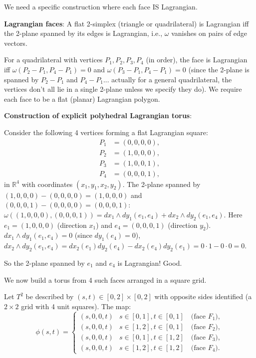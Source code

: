 \documentclass[12pt]{article}
\theoremstyle{definition}
\begin{document}
We need a specific construction where each face IS Lagrangian.

\textbf{Lagrangian faces}: A flat 2-simplex (triangle or quadrilateral) is Lagrangian iff the 2-plane spanned by its edges is Lagrangian, i.e., $\omega$ vanishes on pairs of edge vectors.

For a quadrilateral with vertices $P_1, P_2, P_3, P_4$ (in order), the face is Lagrangian iff $\omega(P_2-P_1, P_4-P_1) = 0$ and $\omega(P_3-P_1, P_4-P_1) = 0$ (since the 2-plane is spanned by $P_2-P_1$ and $P_4-P_1$... actually for a general quadrilateral, the vertices don't all lie in a single 2-plane unless we specify they do). We require each face to be a flat (planar) Lagrangian polygon.

\textbf{Construction of explicit polyhedral Lagrangian torus}:

Consider the following 4 vertices forming a flat Lagrangian square:
\begin{align*}
P_1 &= (0,0,0,0),\\
P_2 &= (1,0,0,0),\\
P_3 &= (1,0,0,1),\\
P_4 &= (0,0,0,1),
\end{align*}
in $\mathbb{R}^4$ with coordinates $(x_1,y_1,x_2,y_2)$. The 2-plane spanned by $(1,0,0,0)-(0,0,0,0) = (1,0,0,0)$ and $(0,0,0,1)-(0,0,0,0) = (0,0,0,1)$:
$\omega((1,0,0,0),(0,0,0,1)) = dx_1\wedge dy_1(e_1, e_4) + dx_2\wedge dy_2(e_1,e_4)$. Here $e_1 = (1,0,0,0)$ (direction $x_1$) and $e_4 = (0,0,0,1)$ (direction $y_2$). $dx_1\wedge dy_1(e_1,e_4) = 0$ (since $dy_1(e_4) = 0$), $dx_2\wedge dy_2(e_1,e_4) = dx_2(e_1)dy_2(e_4) - dx_2(e_4)dy_2(e_1) = 0\cdot 1 - 0\cdot 0 = 0$.

So the 2-plane spanned by $e_1$ and $e_4$ is Lagrangian! Good.

We now build a torus from 4 such faces arranged in a square grid.

Let $T^2$ be described by $(s,t)\in[0,2]\times[0,2]$ with opposite sides identified (a $2\times 2$ grid with 4 unit squares). The map:
$$\phi(s,t) = \begin{cases}(s, 0, 0, t) & s\in[0,1], t\in[0,1] \quad\text{(face }F_1),\\ (s, 0, 0, t) & s\in[1,2], t\in[0,1] \quad\text{(face }F_2),\\ (s, 0, 0, t) & s\in[0,1], t\in[1,2] \quad\text{(face }F_3),\\ (s, 0, 0, t) & s\in[1,2], t\in[1,2] \quad\text{(face }F_4). \end{cases}$$
\end{document}
